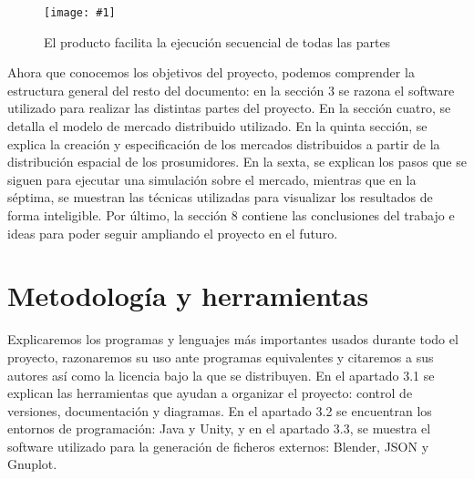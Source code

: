 \documentclass[12pt,a4paper,openright,oneside]{article}
\newcommand{\includeImage}[3]
{
	\begin{figure}[H]
	\begin{center}
	\texttt{[image: \#1]}
	\end{center}
	\caption{#3}
	\end{figure}
}
\numberwithin{equation}{section}
\theoremstyle{definition}
\begin{document}
\includeImage{casos_de_uso_final.png}{14}{ El producto facilita la ejecución secuencial de todas las partes}


















Ahora que conocemos los objetivos del proyecto, podemos comprender la estructura general del resto del documento: en la sección 3 se razona el software utilizado para realizar las distintas partes del proyecto. En la sección cuatro, se detalla el modelo de mercado distribuido utilizado. En la quinta sección, se explica la creación y especificación de los mercados distribuidos a partir de la distribución espacial de los prosumidores. En la sexta, se explican los pasos que se siguen para ejecutar una simulación sobre el mercado, mientras que en la séptima, se muestran las técnicas utilizadas para visualizar los resultados de forma inteligible. Por último, la sección 8 contiene las conclusiones del trabajo e ideas para poder seguir ampliando el proyecto en el futuro.

\newpage




\section{Metodología y herramientas}

Explicaremos los programas y lenguajes más importantes usados durante todo el proyecto, razonaremos su uso ante programas equivalentes y citaremos a sus autores así como la licencia bajo la que se distribuyen. En el apartado 3.1 se explican las herramientas que ayudan a organizar el proyecto: control de versiones, documentación y diagramas. En el apartado 3.2 se encuentran los entornos de programación: Java y Unity, y en el apartado 3.3, se muestra el software utilizado para la generación de ficheros externos: Blender, JSON y Gnuplot.
\end{document}
